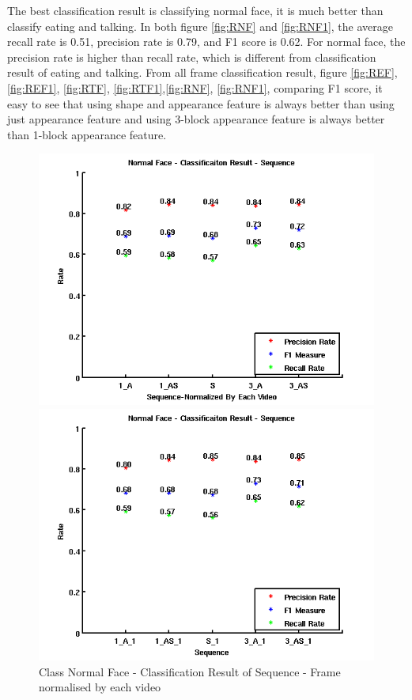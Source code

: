 \newline
The best classification result is classifying normal face, it is much better than classify eating and talking. In both figure \ref{fig:RNF} and \ref{fig:RNF1}, the average recall rate is 0.51, precision rate is 0.79, and F1 score is 0.62. For normal face, the precision rate is higher than recall rate, which is different from classification result of eating and talking. From all frame classification result, figure \ref{fig:REF}, \ref{fig:REF1}, \ref{fig:RTF}, \ref{fig:RTF1},\ref{fig:RNF}, \ref{fig:RNF1}, comparing F1 score, it easy to see that using shape and appearance feature is always better than using just appearance feature and using 3-block appearance feature is always better than 1-block appearance feature.
\begin{figure}[ht]
\centering
\begin{minipage}{.5\textwidth}
  \centering
  \captionsetup{justification=centering, margin=1cm}
  \includegraphics[width=\linewidth]{imgs/Result_NormalFace_Sequence.png}
  \caption{Class Normal Face - Classification Result of Sequence - Frame normalised by each video}
  \label{fig:RNS}
\end{minipage}%
\begin{minipage}{.5\textwidth}
  \centering
  \captionsetup{justification=centering, margin=1cm}
  \includegraphics[width=\linewidth]{imgs/Result_NormalFace_Sequence_1.png}

\end{minipage}
\end{figure}
